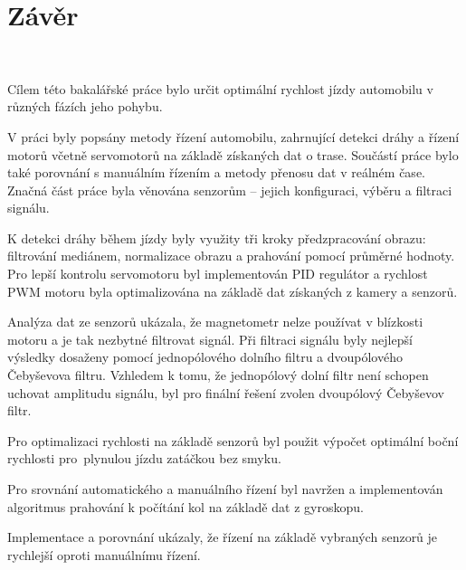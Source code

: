 \chapter{Závěr}
\label{sec:End}
\

Cílem této bakalářské práce bylo určit optimální rychlost jízdy automobilu v různých
fázích jeho pohybu.

V práci byly popsány metody řízení automobilu, zahrnující detekci dráhy a řízení
motorů včetně servomotorů na základě získaných dat o trase. Součástí práce bylo také
porovnání s manuálním řízením a metody přenosu dat v reálném čase. Značná část práce
byla věnována senzorům – jejich konfiguraci, výběru a filtraci signálu.

K detekci dráhy během jízdy byly využity tři kroky předzpracování obrazu: filtrování
mediánem, normalizace obrazu a prahování pomocí průměrné hodnoty. Pro lepší kontrolu
servomotoru byl implementován PID regulátor a rychlost PWM motoru byla optimalizována
na základě dat získaných z kamery a senzorů.

Analýza dat ze senzorů ukázala, že magnetometr nelze používat v blízkosti motoru a je
tak nezbytné filtrovat signál. Při filtraci signálu byly nejlepší výsledky dosaženy
pomocí jednopólového dolního filtru a dvoupólového Čebyševova filtru. Vzhledem k tomu,
že jednopólový dolní filtr není schopen uchovat amplitudu signálu, byl pro finální
řešení zvolen dvoupólový Čebyševov filtr.

Pro optimalizaci rychlosti na základě senzorů byl použit výpočet optimální boční
rychlosti pro~plynulou jízdu zatáčkou bez smyku.

Pro srovnání automatického a manuálního řízení byl navržen a implementován algoritmus
prahování k počítání kol na základě dat z gyroskopu.

Implementace a porovnání ukázaly, že řízení na základě vybraných senzorů je rychlejší
oproti manuálnímu řízení.

\endinput
